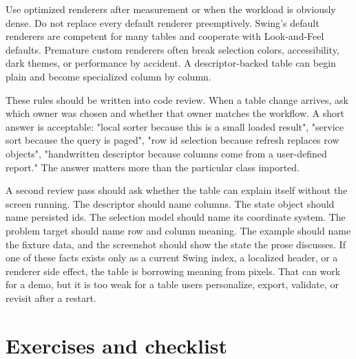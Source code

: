 Use optimized renderers after measurement or when the workload is obviously
dense. Do not replace every default renderer preemptively. Swing's default
renderers are competent for many tables and cooperate with Look-and-Feel
defaults. Premature custom renderers often break selection colors,
accessibility, dark themes, or performance by accident. A descriptor-backed
table can begin plain and become specialized column by column.

These rules should be written into code review. When a table change arrives,
ask which owner was chosen and whether that owner matches the workflow. A
short answer is acceptable: "local sorter because this is a small loaded
result", "service sort because the query is paged", "row id selection because
refresh replaces row objects", "handwritten descriptor because columns come
from a user-defined report." The answer matters more than the particular
class imported.

A second review pass should ask whether the table can explain itself without
the screen running. The descriptor should name columns. The state object should
name persisted ids. The selection model should name its coordinate system. The
problem target should name row and column meaning. The example should name the
fixture data, and the screenshot should show the state the prose discusses. If
one of these facts exists only as a current Swing index, a localized header, or
a renderer side effect, the table is borrowing meaning from pixels. That can
work for a demo, but it is too weak for a table users personalize, export,
validate, or revisit after a restart.

\section{Exercises and checklist}

